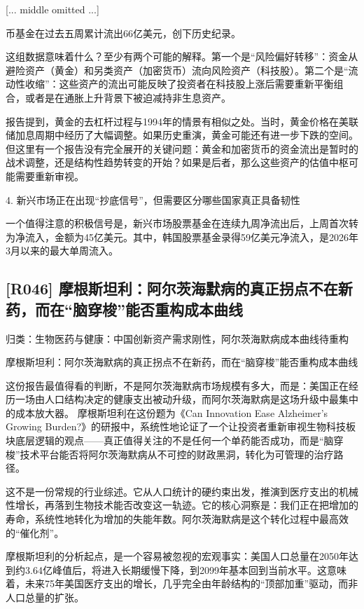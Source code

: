 \documentclass[11pt]{ctexart}
\begin{document}
[... middle omitted ...]

币基金在过去五周累计流出66亿美元，创下历史纪录。

这组数据意味着什么？至少有两个可能的解释。第一个是“风险偏好转移”：资金从避险资产（黄金）和另类资产（加密货币）流向风险资产（科技股）。第二个是“流动性收缩”：这些资产的流出可能反映了投资者在科技股上涨后需要重新平衡组合，或者是在通胀上升背景下被迫减持非生息资产。

报告提到，黄金的去杠杆过程与1994年的情景有相似之处。当时，黄金价格在美联储加息周期中经历了大幅调整。如果历史重演，黄金可能还有进一步下跌的空间。但这里有一个报告没有完全展开的关键问题：黄金和加密货币的资金流出是暂时的战术调整，还是结构性趋势转变的开始？如果是后者，那么这些资产的估值中枢可能需要重新审视。

4. 新兴市场正在出现“抄底信号”，但需要区分哪些国家真正具备韧性

一个值得注意的积极信号是，新兴市场股票基金在连续九周净流出后，上周首次转为净流入，金额为45亿美元。其中，韩国股票基金录得59亿美元净流入，是2026年3月以来的最大单周流入。

\subsection{[R046] 摩根斯坦利：阿尔茨海默病的真正拐点不在新药，而在“脑穿梭”能否重构成本曲线}
{\small\color{refgray}归类：生物医药与健康：中国创新资产需求刚性，阿尔茨海默病成本曲线待重构}

摩根斯坦利：阿尔茨海默病的真正拐点不在新药，而在“脑穿梭”能否重构成本曲线

这份报告最值得看的判断，不是阿尔茨海默病市场规模有多大，而是：美国正在经历一场由人口结构决定的健康支出被动升级，而阿尔茨海默病是这场升级中最集中的成本放大器。 摩根斯坦利在这份题为《Can Innovation Ease Alzheimer's Growing Burden?》的研报中，系统性地论证了一个让投资者重新审视生物科技板块底层逻辑的观点——真正值得关注的不是任何一个单药能否成功，而是“脑穿梭”技术平台能否将阿尔茨海默病从不可控的财政黑洞，转化为可管理的治疗路径。

这不是一份常规的行业综述。它从人口统计的硬约束出发，推演到医疗支出的机械性增长，再落到生物技术能否改变这一轨迹。它的核心洞察是：我们正在把增加的寿命，系统性地转化为增加的失能年数。阿尔茨海默病是这个转化过程中最高效的“催化剂”。

摩根斯坦利的分析起点，是一个容易被忽视的宏观事实：美国人口总量在2050年达到约3.64亿峰值后，将进入长期缓慢下降，到2099年基本回到当前水平。这意味着，未来75年美国医疗支出的增长，几乎完全由年龄结构的“顶部加重”驱动，而非人口总量的扩张。
\end{document}
